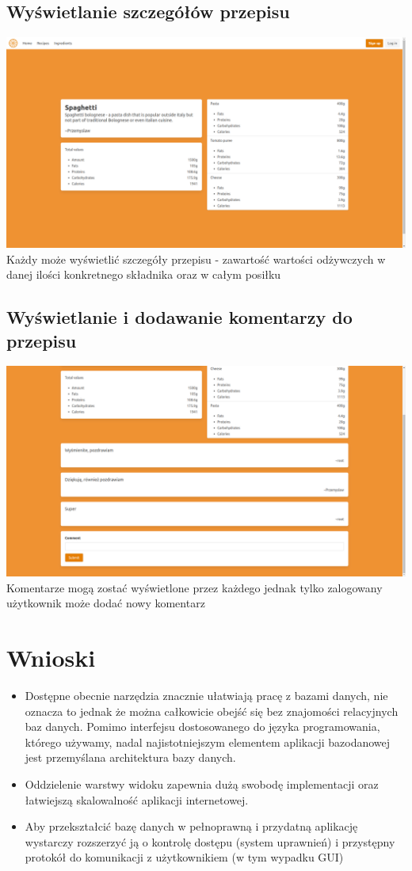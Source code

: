 \documentclass[11pt]{article}
\begin{document}
\subsection{Wyświetlanie szczegółów przepisu}
\includegraphics[width=15.5cm]{recipe_view.png}
\newline
Każdy może wyświetlić szczegóły przepisu - zawartość wartości odżywczych w danej ilości konkretnego składnika oraz w całym posiłku
\subsection{Wyświetlanie i dodawanie komentarzy do przepisu}
\includegraphics[width=15.5cm]{comments.png}
\newline
Komentarze mogą zostać wyświetlone przez każdego jednak tylko zalogowany użytkownik może dodać nowy komentarz

\section{Wnioski}
\begin{itemize}
    \item Dostępne obecnie narzędzia znacznie ułatwiają pracę z bazami danych, nie oznacza to jednak że można całkowicie obejść się bez znajomości relacyjnych baz danych. Pomimo interfejsu dostosowanego do języka programowania, którego używamy, nadal najistotniejszym elementem aplikacji bazodanowej jest przemyślana architektura bazy danych.
    \item Oddzielenie warstwy widoku zapewnia dużą swobodę implementacji oraz łatwiejszą skalowalność aplikacji internetowej.
    \item Aby przekształcić bazę danych w pełnoprawną i przydatną aplikację wystarczy rozszerzyć ją o kontrolę dostępu (system uprawnień) i przystępny protokół do komunikacji z użytkownikiem (w tym wypadku GUI)
\end{itemize}
\end{document}
